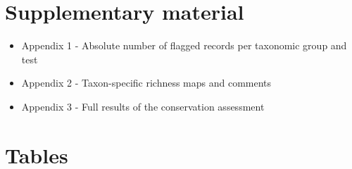 \documentclass[fleqn,10pt,lineno]{wlpeerj} %
\begin{document}
\hypertarget{supplementary-material}{%
\section*{Supplementary material}\label{supplementary-material}}

\begin{itemize}
\item
  Appendix 1 - Absolute number of flagged records per taxonomic group and test
\item
  Appendix 2 - Taxon-specific richness maps and comments
\item
  Appendix 3 - Full results of the conservation assessment
\end{itemize}

\newpage{}

\hypertarget{tables}{%
\section*{Tables}\label{tables}}

\newpage{}
\end{document}
